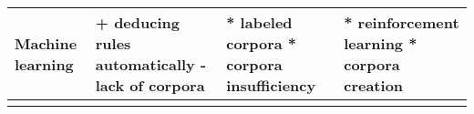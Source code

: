 \begin{table}[ht]
\begin{tabular}{p{}p{}p{}p{}}
		\hline\noalign{\smallskip}
		
		Machine learning 
		& 
		+ deducing rules automatically \newline
		- lack of corpora \newline
		& 
		* labeled corpora \newline
		* corpora insufficiency
		& 
		* reinforcement learning \newline
		* corpora creation
		\\
		
		\hline\noalign{\smallskip}
		
%		
	\end{tabular} 
\end{table}

